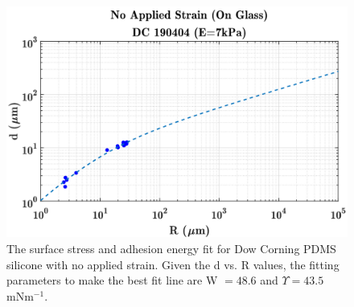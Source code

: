 \begin{figure}[h]
	\centering
	\includegraphics[width=\linewidth]{Chapters/Figures/WUps_fit_DC190404}
	\caption[D-C W $\Upsilon $ Fit]{The surface stress and adhesion energy fit for Dow Corning PDMS silicone with no applied strain. Given the d vs. R values, the fitting parameters to make the best fit line are W $ = 48.6$ and  $\Upsilon = 43.5$ mNm$^{-1}$.}
	\label{fig:wupsfitdc190404}
\end{figure}

